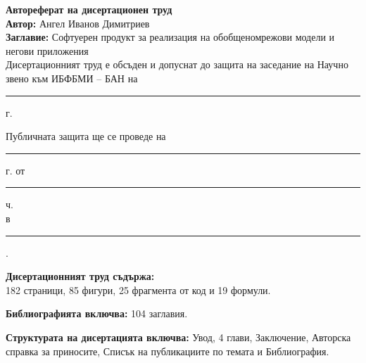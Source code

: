 \newpage
\thispagestyle{empty}

\begin{flushleft}

{\large \textbf{Автореферат на дисертационен труд}}\\[0.5cm]

\textbf{Автор:} Ангел Иванов Димитриев\\[0.3cm]
\textbf{Заглавие:} Софтуерен продукт за реализация на обобщеномрежови модели и негови приложения\\[0.5cm]

Дисертационният труд е обсъден и допуснат до защита на заседание на Научно звено към ИБФБМИ – БАН на \rule{5cm}{0.4pt} г.

\vspace{0.5cm}

Публичната защита ще се проведе на \rule{5cm}{0.4pt} г. от \rule{3cm}{0.4pt} ч. \\
в \rule{8cm}{0.4pt}.

\vspace{1cm}



\vspace{1cm}

\textbf{Дисертационният труд съдържа:} \\
182 страници, 85 фигури, 25 фрагмента от код и 19 формули.

\vspace{0.3cm}

\textbf{Библиографията включва:} 104 заглавия.

\vspace{0.3cm}

\textbf{Структурата на дисертацията включва:} Увод, 4 глави, Заключение, Авторска справка за приносите, Списък на публикациите по темата и Библиография.


\end{flushleft}

